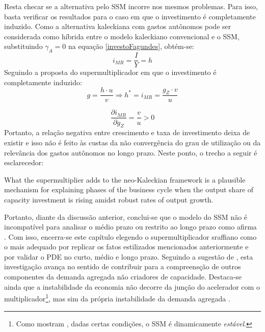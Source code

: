 Resta checar se a alternativa pelo SSM incorre nos mesmos problemas. Para isso, basta verificar os resultados para o caso em que o investimento é completamente induzido. Como a alternativa kaleckiana com gastos autônomos pode ser considerada como híbrida entre o modelo kaleckiano convencional e o SSM, substituindo $\gamma_A = 0$ na equação \ref{investoFagundes}, obtém-se:
$$
i_{MR} = \frac{I}{Y} =  h
$$
Seguindo a proposta do supermultiplicador em que o investimento é completamente induzido:
$$
g = \frac{h\cdot u}{v} \Rightarrow h^* = i_{MR} = \frac{g_Z\cdot v}{u}
$$

$$
\frac{\partial i_{MR}}{\partial g_Z} = \frac{v}{u} > 0
$$
Portanto, a relação negativa entre crescimento e taxa de investimento deixa de existir e isso não é feito às custas da não convergência do grau de utilização ou da relevância dos gastos autônomos no longo prazo. Neste ponto, o trecho a seguir é esclarecedor:

\begin{citacao}
	What the supermultiplier adds to the neo-Kaleckian framework is a plausible mechanism for explaining phases
	of the business cycle when the output share of capacity investment is rising amidst robust rates of output growth. \cite[p.~9]{fiebiger_trend_2017}
\end{citacao}
 Portanto, diante da discussão anterior, conclui-se que o modelo do SSM não é incompatível para analisar o médio prazo ou restrito ao longo prazo como afirma \textcite{nikiforos_comments_2018}. Com isso, encerra-se este capítulo elegendo o supermultiplicador sraffiano como o mais adequado por replicar os fatos estilizados mencionados anteriormente e por validar o PDE no curto, médio e longo prazo. Seguindo a sugestão de \textcite[p.~280]{freitas_growth_2015}, esta investigação avança no sentido de contribuir para a compreensção de outros componentes da demanda agregada não criadores de capacidade. Destaca-se ainda que a instabilidade da economia não decorre da junção do acelerador com o multiplicador\footnote{Como mostram \textcite{serrano_trouble_2017}, dadas certas condições, o SSM é dinamicamente \textit{estável}.}, mas sim da própria instabilidade da demanda agregada \cite{dejuan_hidden_2017}.
